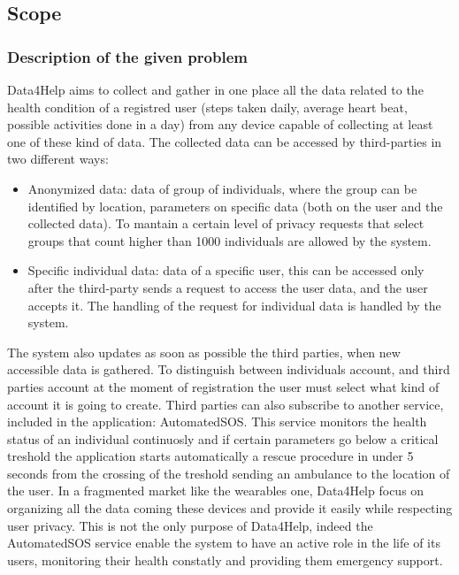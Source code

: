 \documentclass[a4paper,12pt]{article}
\begin{document}
\subsection{Scope}
\subsubsection{Description of the given problem}
Data4Help aims to collect and gather in one place all the data related to the health condition of a registred user (steps taken daily, average heart beat, possible activities done in a day) from any device capable of collecting at least one of these kind of data.
The collected data can be accessed by third-parties in two different ways:
\begin{itemize}
\item Anonymized data: data of group of individuals, where the group can be identified by location, parameters on specific data (both on the user and the collected data). To mantain a certain level of privacy requests that select groups that count higher than 1000 individuals are allowed by the system.
\item Specific individual data: data of a specific user, this can be accessed only after the third-party sends a request to access the user data, and the user accepts it. The handling of the request for individual data is handled by the system.
\end{itemize}
The system also updates as soon as possible the third parties, when new accessible data is gathered.
To distinguish between individuals account, and third parties account at the moment of registration the user must select what kind of account it is going to create.
Third parties can also subscribe to another service, included in the application: AutomatedSOS. This service monitors the health status of an individual continuosly and if certain parameters go below a critical treshold the application starts automatically a rescue procedure in under 5 seconds from the crossing of the treshold sending an ambulance to the location of the user.
\newline
In a fragmented market like the wearables one, Data4Help focus on organizing all the data coming these devices and provide it easily while respecting user privacy.
 \newline
This is not the only purpose of Data4Help, indeed the AutomatedSOS service enable the system to have an active role in the life of its users, monitoring their health constatly and providing them emergency support.
\end{document}
